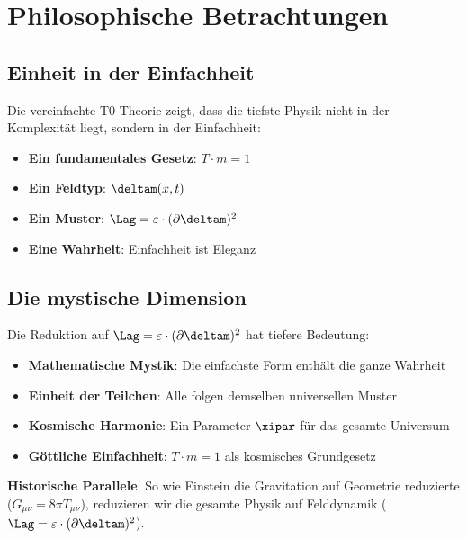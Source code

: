 	\section{Philosophische Betrachtungen}
	
	\subsection{Einheit in der Einfachheit}
	
	\begin{tcolorbox}[colback=green!5!white,colframe=green!75!black,title=Philosophische Erkenntnis]
		Die vereinfachte T0-Theorie zeigt, dass die tiefste Physik nicht in der Komplexität liegt, sondern in der Einfachheit:
		
		\begin{itemize}
			\item \textbf{Ein fundamentales Gesetz}: $T \cdot m = 1$
			\item \textbf{Ein Feldtyp}: $\deltam(x,t)$
			\item \textbf{Ein Muster}: $\Lag = \varepsilon \cdot (\partial \deltam)^2$
			\item \textbf{Eine Wahrheit}: Einfachheit ist Eleganz
		\end{itemize}
	\end{tcolorbox}
	
	\subsection{Die mystische Dimension}
	
	Die Reduktion auf $\Lag = \varepsilon \cdot (\partial \deltam)^2$ hat tiefere Bedeutung:
	
	\begin{itemize}
		\item \textbf{Mathematische Mystik}: Die einfachste Form enthält die ganze Wahrheit
		\item \textbf{Einheit der Teilchen}: Alle folgen demselben universellen Muster
		\item \textbf{Kosmische Harmonie}: Ein Parameter $\xipar$ für das gesamte Universum
		\item \textbf{Göttliche Einfachheit}: $T \cdot m = 1$ als kosmisches Grundgesetz
	\end{itemize}
	
	\textbf{Historische Parallele}: So wie Einstein die Gravitation auf Geometrie reduzierte ($G_{\mu\nu} = 8\pi T_{\mu\nu}$), reduzieren wir die gesamte Physik auf Felddynamik ($\Lag = \varepsilon \cdot (\partial \deltam)^2$).
	
